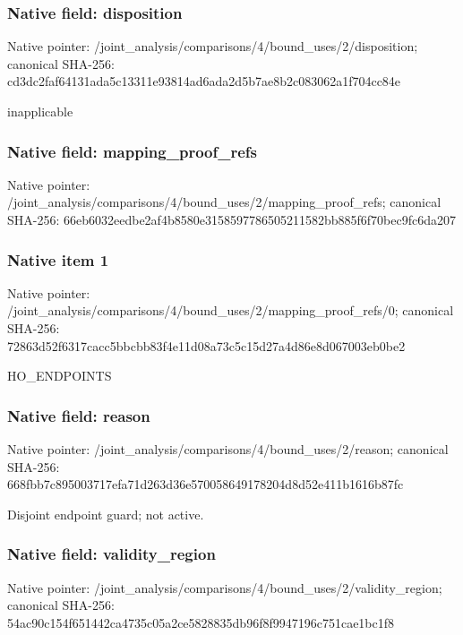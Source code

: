 \documentclass[10pt,a4paper]{article}
\begin{document}
\subsubsection{Native field: disposition}
Native pointer: /joint\_\allowbreak{}analysis/comparisons/4/bound\_\allowbreak{}uses/2/disposition; canonical SHA-256: cd3dc2faf64131ada5c13311e93814ad6ada2d5b7ae8b2c083062a1f704cc84e

\begingroup\raggedright\sloppy inapplicable\par\endgroup

\subsubsection{Native field: mapping\_\allowbreak{}proof\_\allowbreak{}refs}
Native pointer: /joint\_\allowbreak{}analysis/comparisons/4/bound\_\allowbreak{}uses/2/mapping\_\allowbreak{}proof\_\allowbreak{}refs; canonical SHA-256: 66eb6032eedbe2af4b8580e3158597786505211582bb885f6f70bec9fc6da207

\subsubsection{Native item 1}
Native pointer: /joint\_\allowbreak{}analysis/comparisons/4/bound\_\allowbreak{}uses/2/mapping\_\allowbreak{}proof\_\allowbreak{}refs/0; canonical SHA-256: 72863d52f6317cacc5bbcbb83f4e11d08a73c5c15d27a4d86e8d067003eb0be2

\begingroup\raggedright\sloppy HO\_\allowbreak{}ENDPOINTS\par\endgroup

\subsubsection{Native field: reason}
Native pointer: /joint\_\allowbreak{}analysis/comparisons/4/bound\_\allowbreak{}uses/2/reason; canonical SHA-256: 668fbb7c895003717efa71d263d36e570058649178204d8d52e411b1616b87fc

\begingroup\raggedright\sloppy Disjoint endpoint guard;\allowbreak{} not active.\par\endgroup

\subsubsection{Native field: validity\_\allowbreak{}region}
Native pointer: /joint\_\allowbreak{}analysis/comparisons/4/bound\_\allowbreak{}uses/2/validity\_\allowbreak{}region; canonical SHA-256: 54ac90c154f651442ca4735c05a2ce5828835db96f8f9947196c751cae1bc1f8
\end{document}
